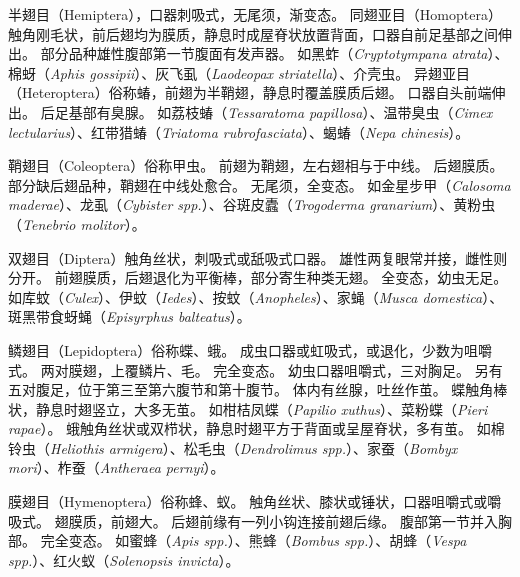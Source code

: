\documentclass[11pt]{article}
\begin{document}
\newline

半翅目（Hemiptera），口器刺吸式，无尾须，渐变态。
同翅亚目（Homoptera）触角刚毛状，前后翅均为膜质，静息时成屋脊状放置背面，口器自前足基部之间伸出。
部分品种雄性腹部第一节腹面有发声器。
如黑蚱（\textit{Cryptotympana atrata}）、棉蚜（\textit{Aphis gossipii}）、灰飞虱（\textit{Laodeopax striatella}）、介壳虫。
异翅亚目（Heteroptera）俗称蝽，前翅为半鞘翅，静息时覆盖膜质后翅。
口器自头前端伸出。
后足基部有臭腺。
如荔枝蝽（\textit{Tessaratoma papillosa}）、温带臭虫（\textit{Cimex lectularius}）、红带猎蝽（\textit{Triatoma rubrofasciata}）、蝎蝽（\textit{Nepa chinesis}）。

\newline

鞘翅目（Coleoptera）俗称甲虫。
前翅为鞘翅，左右翅相与于中线。
后翅膜质。
部分缺后翅品种，鞘翅在中线处愈合。
无尾须，全变态。
如金星步甲（\textit{Calosoma maderae}）、龙虱（\textit{Cybister spp.}）、谷斑皮蠹（\textit{Trogoderma granarium}）、黄粉虫（\textit{Tenebrio molitor}）。

\newline

双翅目（Diptera）触角丝状，刺吸式或舐吸式口器。
雄性两复眼常并接，雌性则分开。
前翅膜质，后翅退化为平衡棒，部分寄生种类无翅。
全变态，幼虫无足。
如库蚊（\textit{Culex}）、伊蚊（\textit{Iedes}）、按蚊（\textit{Anopheles}）、家蝇（\textit{Musca domestica}）、斑黑带食蚜蝇（\textit{Episyrphus balteatus}）。

\newline

鳞翅目（Lepidoptera）俗称蝶、蛾。
成虫口器或虹吸式，或退化，少数为咀嚼式。
两对膜翅，上覆鳞片、毛。
完全变态。
幼虫口器咀嚼式，三对胸足。
另有五对腹足，位于第三至第六腹节和第十腹节。
体内有丝腺，吐丝作茧。
蝶触角棒状，静息时翅竖立，大多无茧。
如柑桔凤蝶（\textit{Papilio xuthus}）、菜粉蝶（\textit{Pieri rapae}）。
蛾触角丝状或双栉状，静息时翅平方于背面或呈屋脊状，多有茧。
如棉铃虫（\textit{Heliothis armigera}）、松毛虫（\textit{Dendrolimus spp.}）、家蚕（\textit{Bombyx mori}）、柞蚕（\textit{Antheraea pernyi}）。

\newline

膜翅目（Hymenoptera）俗称蜂、蚁。
触角丝状、膝状或锤状，口器咀嚼式或嚼吸式。
翅膜质，前翅大。
后翅前缘有一列小钩连接前翅后缘。
腹部第一节并入胸部。
完全变态。
如蜜蜂（\textit{Apis spp.}）、熊蜂（\textit{Bombus spp.}）、胡蜂（\textit{Vespa spp.}）、红火蚁（\textit{Solenopsis invicta}）。
\end{document}
